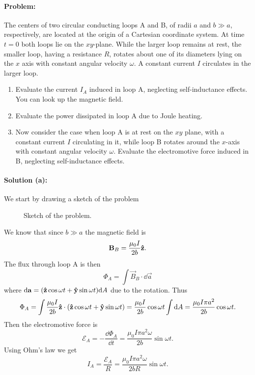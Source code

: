 \paragraph{Problem:} The centers of two circular conducting loops A and B, of radii $a$ and $b \gg a$, respectively, are located at the origin of a Cartesian coordinate system. At time $t = 0$ both loops lie on the $xy$-plane. While the larger loop remains at rest, the smaller loop, having a resistance $R$, rotates about one of its diameters lying on the $x$ axis with constant angular velocity $\omega$. A constant current $I$ circulates in the larger loop.
\begin{enumerate}[label=(\alph*)]
    \item Evaluate the current $I_A$ induced in loop A, neglecting self-inductance effects. You can look up the magnetic field.
    \item Evaluate the power dissipated in loop A due to Joule heating.
    \item Now consider the case when loop A is at rest on the $xy$ plane, with a constant current $I$ circulating in it, while loop B rotates around the $x$-axis with constant angular velocity $\omega$. Evaluate the electromotive force induced in B, neglecting self-inductance effects.
\end{enumerate}

\paragraph{Solution (a):} We start by drawing a sketch of the problem
\begin{figure}[H]
    \centering
    
    \caption{Sketch of the problem.}
    \label{fig:sketch}
\end{figure}

We know that since $b \gg a$ the magnetic field is 
\begin{equation}
    \bm{\mathrm{B}}_B = \frac{\mu_0 I}{2 b} \bm{\mathrm{\hat{z}}}.
\end{equation}
The flux through loop A is then
\begin{equation}
    \Phi_A = \int \vec{B}_B \cdot \dd \vec{a}
\end{equation}
where $\dd \bm{\mathrm{a}} = (\bm{\mathrm{\hat{z}}} \cos\omega t + \bm{\mathrm{\hat{y}}} \sin \omega t)\dd A$ due to the rotation. Thus
\begin{equation}
    \Phi_A = \int \frac{\mu_0 I}{2 b} \bm{\mathrm{\hat{z}}} \cdot (\bm{\mathrm{\hat{z}}} \cos\omega t + \bm{\mathrm{\hat{y}}} \sin \omega t) 
    = \frac{\mu_0 I}{2b} \cos\omega t \int\dd A
    = \frac{\mu_0 I \pi a^2}{2b} \cos\omega t.
\end{equation}
Then the electromotive force is 
\begin{equation}
    \mathcal{E}_A = - \frac{\dd \Phi_A}{\dd t} = \frac{\mu_0 I \pi a^2 \omega}{2 b} \sin\omega t.
\end{equation}
Using Ohm's law we get
\begin{equation}
    I_A = \frac{\mathcal{E}_A}{R} =\frac{\mu_0 I \pi a^2 \omega}{2 b R} \sin\omega t.
\end{equation}

